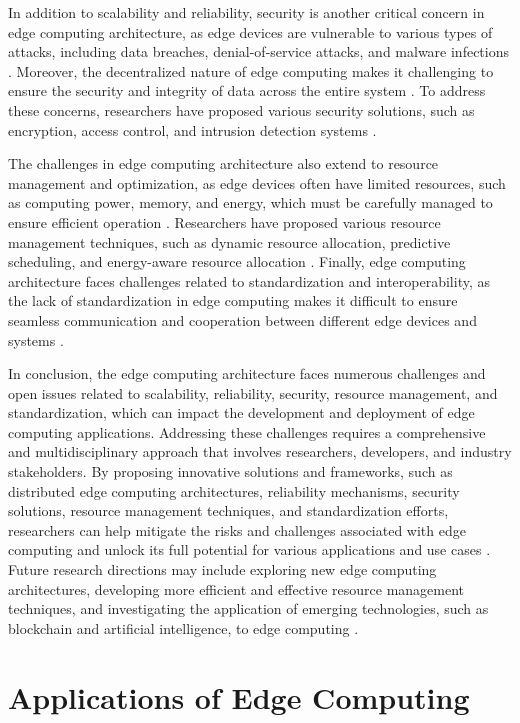 \documentclass[11pt]{article}
\begin{document}
In addition to scalability and reliability, security is another critical concern in edge computing architecture, as edge devices are vulnerable to various types of attacks, including data breaches, denial-of-service attacks, and malware infections \cite{ref16}. Moreover, the decentralized nature of edge computing makes it challenging to ensure the security and integrity of data across the entire system \cite{ref39}. To address these concerns, researchers have proposed various security solutions, such as encryption, access control, and intrusion detection systems \cite{ref40}.

The challenges in edge computing architecture also extend to resource management and optimization, as edge devices often have limited resources, such as computing power, memory, and energy, which must be carefully managed to ensure efficient operation \cite{ref41}. Researchers have proposed various resource management techniques, such as dynamic resource allocation, predictive scheduling, and energy-aware resource allocation \cite{ref42}. Finally, edge computing architecture faces challenges related to standardization and interoperability, as the lack of standardization in edge computing makes it difficult to ensure seamless communication and cooperation between different edge devices and systems \cite{ref1}.

In conclusion, the edge computing architecture faces numerous challenges and open issues related to scalability, reliability, security, resource management, and standardization, which can impact the development and deployment of edge computing applications. Addressing these challenges requires a comprehensive and multidisciplinary approach that involves researchers, developers, and industry stakeholders. By proposing innovative solutions and frameworks, such as distributed edge computing architectures, reliability mechanisms, security solutions, resource management techniques, and standardization efforts, researchers can help mitigate the risks and challenges associated with edge computing and unlock its full potential for various applications and use cases \cite{ref43}. Future research directions may include exploring new edge computing architectures, developing more efficient and effective resource management techniques, and investigating the application of emerging technologies, such as blockchain and artificial intelligence, to edge computing \cite{ref44}.

\section{Applications of Edge Computing}
\end{document}
